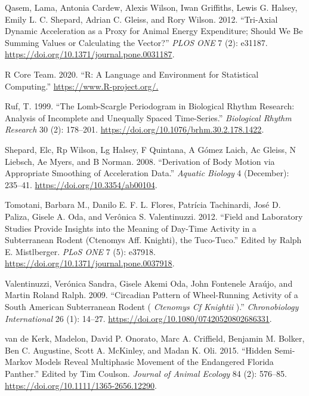 \documentclass[english,msc,numbers,hidelinks]{coppe}
\newlength{\cslhangindent}
\newenvironment{CSLReferences}[2] %
 {%
  \setlength{\parindent}{0pt}
  \ifodd #1 \everypar{\setlength{\hangindent}{\cslhangindent}}\ignorespaces\fi
  \ifnum #2 > 0
  \setlength{\parskip}{#2\baselineskip}
  \fi
 }%
 {}
\begin{document}
\begin{CSLReferences}{1}{0}
  \leavevmode{}%
  Qasem, Lama, Antonia Cardew, Alexis Wilson, Iwan Griffiths, Lewis G. Halsey, Emily L. C. Shepard, Adrian C. Gleiss, and Rory Wilson. 2012. {``Tri-Axial Dynamic Acceleration as a Proxy for Animal Energy Expenditure; Should We Be Summing Values or Calculating the Vector?''} \emph{PLOS ONE} 7 (2): e31187. \url{https://doi.org/10.1371/journal.pone.0031187}.

  \leavevmode{}%
  R Core Team. 2020. {``R: A Language and Environment for Statistical Computing.''} \url{https://www.R-project.org/.}

  \leavevmode{}%
  Ruf, T. 1999. {``The Lomb-Scargle Periodogram in Biological Rhythm Research: Analysis of Incomplete and Unequally Spaced Time-Series.''} \emph{Biological Rhythm Research} 30 (2): 178--201. \url{https://doi.org/10.1076/brhm.30.2.178.1422}.

  \leavevmode{}%
  Shepard, Elc, Rp Wilson, Lg Halsey, F Quintana, A Gómez Laich, Ac Gleiss, N Liebsch, Ae Myers, and B Norman. 2008. {``Derivation of Body Motion via Appropriate Smoothing of Acceleration Data.''} \emph{Aquatic Biology} 4 (December): 235--41. \url{https://doi.org/10.3354/ab00104}.

  \leavevmode{}%
  Tomotani, Barbara M., Danilo E. F. L. Flores, Patrícia Tachinardi, José D. Paliza, Gisele A. Oda, and Verônica S. Valentinuzzi. 2012. {``Field and Laboratory Studies Provide Insights into the Meaning of Day-Time Activity in a Subterranean Rodent (Ctenomys Aff. Knighti), the Tuco-Tuco.''} Edited by Ralph E. Mistlberger. \emph{PLoS ONE} 7 (5): e37918. \url{https://doi.org/10.1371/journal.pone.0037918}.

  \leavevmode{}%
  Valentinuzzi, Verónica Sandra, Gisele Akemi Oda, John Fontenele Araújo, and Martin Roland Ralph. 2009. {``Circadian Pattern of Wheel{-}Running Activity of a South American Subterranean Rodent ( {\emph{Ctenomys Cf Knightii}} ).''} \emph{Chronobiology International} 26 (1): 14--27. \url{https://doi.org/10.1080/07420520802686331}.

  \leavevmode{}%
  van de Kerk, Madelon, David P. Onorato, Marc A. Criffield, Benjamin M. Bolker, Ben C. Augustine, Scott A. McKinley, and Madan K. Oli. 2015. {``Hidden Semi-Markov Models Reveal Multiphasic Movement of the Endangered Florida Panther.''} Edited by Tim Coulson. \emph{Journal of Animal Ecology} 84 (2): 576--85. \url{https://doi.org/10.1111/1365-2656.12290}.


\end{CSLReferences}
\end{document}
